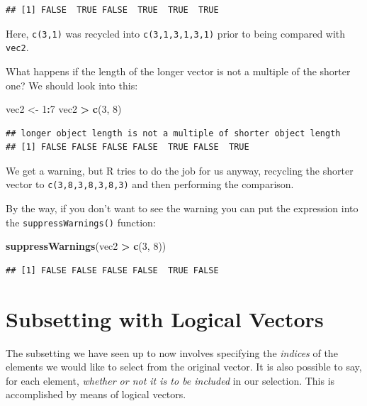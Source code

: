 \documentclass[]{book}
\makeatletter
\newenvironment{Shaded}{\begin{snugshade}}{\end{snugshade}}
\newcommand{\KeywordTok}[1]{\textcolor[rgb]{0.13,0.29,0.53}{\textbf{#1}}}
\newcommand{\DecValTok}[1]{\textcolor[rgb]{0.00,0.00,0.81}{#1}}
\newcommand{\StringTok}[1]{\textcolor[rgb]{0.31,0.60,0.02}{#1}}
\newcommand{\OperatorTok}[1]{\textcolor[rgb]{0.81,0.36,0.00}{\textbf{#1}}}
\newcommand{\NormalTok}[1]{#1}
\newenvironment{kframe}{%
\medskip{}
\setlength{\fboxsep}{.8em}
 \def\at@end@of@kframe{}%
 \ifinner\ifhmode%
  \def\at@end@of@kframe{\end{minipage}}%
  \begin{minipage}{\columnwidth}%
 \fi\fi%
 \def\FrameCommand##1{\hskip\@totalleftmargin \hskip-\fboxsep
 \colorbox{shadecolor}{##1}\hskip-\fboxsep
     \hskip-\linewidth \hskip-\@totalleftmargin \hskip\columnwidth}%
 \MakeFramed {\advance\hsize-\width
   \@totalleftmargin\z@ \linewidth\hsize
   \@setminipage}}%
 {\par\unskip\endMakeFramed%
 \at@end@of@kframe}
\renewenvironment{Shaded}{\begin{kframe}}{\end{kframe}}
\theoremstyle{definition}
\theoremstyle{definition}
\theoremstyle{definition}
\theoremstyle{remark}
\makeatother
\begin{document}
\begin{verbatim}
## [1] FALSE  TRUE FALSE  TRUE  TRUE  TRUE
\end{verbatim}

Here, \texttt{c(3,1)} was recycled into \texttt{c(3,1,3,1,3,1)} prior to
being compared with \texttt{vec2}.

What happens if the length of the longer vector is not a multiple of the
shorter one? We should look into this:

\begin{Shaded}
\begin{Highlighting}[]
\NormalTok{vec2 <-}\StringTok{ }\DecValTok{1}\OperatorTok{:}\DecValTok{7}
\NormalTok{vec2 }\OperatorTok{>}\StringTok{ }\KeywordTok{c}\NormalTok{(}\DecValTok{3}\NormalTok{, }\DecValTok{8}\NormalTok{)}
\end{Highlighting}
\end{Shaded}

\begin{verbatim}
## longer object length is not a multiple of shorter object length
## [1] FALSE FALSE FALSE FALSE  TRUE FALSE  TRUE
\end{verbatim}

We get a warning, but R tries to do the job for us anyway, recycling the
shorter vector to \texttt{c(3,8,3,8,3,8,3)} and then performing the
comparison.

By the way, if you don't want to see the warning you can put the
expression into the
\texttt{suppressWarnings()}
function:

\begin{Shaded}
\begin{Highlighting}[]
\KeywordTok{suppressWarnings}\NormalTok{(vec2 }\OperatorTok{>}\StringTok{ }\KeywordTok{c}\NormalTok{(}\DecValTok{3}\NormalTok{, }\DecValTok{8}\NormalTok{))}
\end{Highlighting}
\end{Shaded}

\begin{verbatim}
## [1] FALSE FALSE FALSE FALSE  TRUE FALSE
\end{verbatim}

\section{Subsetting with Logical
Vectors}\label{subsetting-with-logical-vectors}

The subsetting we have seen up to now involves specifying the
\emph{indices} of the elements we would like to select from the original
vector. It is also possible to say, for each element, \emph{whether or
not it is to be included} in our selection. This is accomplished by
means of logical vectors.
\end{document}
